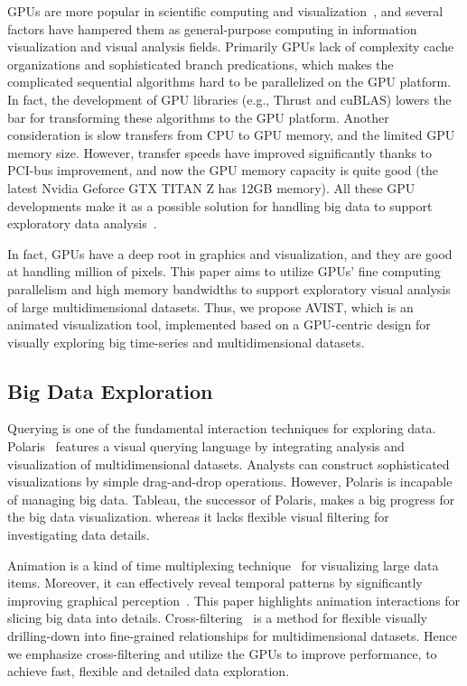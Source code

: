 GPUs are more popular in scientific computing and visualization~\cite{volume}, and several factors have hampered them as general-purpose computing in information visualization and visual analysis fields. Primarily GPUs lack of complexity cache organizations and sophisticated branch predications, which makes the complicated sequential algorithms hard to be parallelized on the GPU platform. In fact,  the development of GPU libraries (e.g., Thrust and cuBLAS) lowers the bar for transforming these algorithms to the GPU platform. Another consideration is slow transfers from CPU to GPU memory, and the limited GPU memory size. However, transfer speeds have improved significantly thanks to PCI-bus improvement, and now the GPU memory capacity is quite good (the latest Nvidia Geforce GTX TITAN Z has 12GB memory).  All these GPU developments make it as a possible solution for handling big data to support exploratory data analysis~\cite{Pawliczek}. 

In fact, GPUs have a deep root in graphics and visualization, and they are good at handling million of pixels. This paper aims to utilize GPUs' fine computing parallelism and high memory bandwidths to support exploratory visual analysis of large multidimensional datasets. Thus, we propose AVIST, which is an animated visualization tool, implemented based on a GPU-centric design for visually exploring big time-series and multidimensional datasets. 

\subsection{Big Data Exploration}
Querying is one of the fundamental interaction techniques for exploring data. Polaris~\cite{polaris} features a visual querying language by integrating analysis and visualization of multidimensional datasets. Analysts can construct sophisticated visualizations by simple drag-and-drop operations. However, Polaris is incapable of managing big data. Tableau, the successor of Polaris, makes a big progress for the big data visualization.  whereas it lacks flexible visual filtering for investigating data details.

Animation is a kind of time multiplexing technique~\cite{Fekete} for visualizing large data items. Moreover, it can effectively reveal temporal patterns by significantly improving graphical perception~\cite{animated}. This paper highlights animation interactions for slicing big data into details. Cross-filtering~\cite{weaver2010} is a method for flexible visually drilling-down into fine-grained relationships for multidimensional datasets. Hence we emphasize cross-filtering and utilize the GPUs to improve performance, to achieve fast, flexible and detailed data exploration. 


